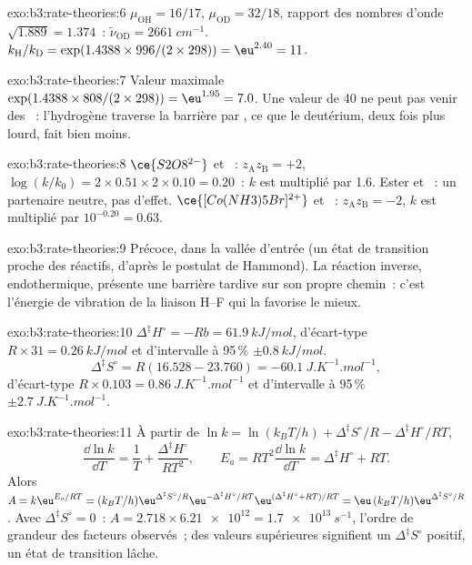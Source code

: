 \begin{solution}{exo:b3:rate-theories:6}
$\mu_{\mathrm{OH}} = 16/17$, $\mu_{\mathrm{OD}} = 32/18$, rapport des nombres d'onde $\sqrt{1.889} = 1.374$~:
$\tilde\nu_{\mathrm{OD}} = \qty{2661}{cm^{-1}}$. $k_{\mathrm H}/k_{\mathrm D} = \exp(1.4388 \times 996/(2 \times 298)) = \eu^{2.40} = 11$.
\end{solution}

\begin{solution}{exo:b3:rate-theories:7}
Valeur maximale $\exp(1.4388 \times 808/(2 \times 298)) = \eu^{1.95} = 7.0$.
Une valeur de 40 ne peut pas venir des ~:
l'hydrogène traverse la barrière par , ce que le deutérium,
deux fois plus lourd, fait bien moins.
\end{solution}

\begin{solution}{exo:b3:rate-theories:8}
$\ce{S2O8^{2-}}$ et ~: $z_{\mathrm A}z_{\mathrm B} = +2$, $\log(k/k_0) = 2 \times 0.51 \times 2 \times 0.10 = 0.20$~: $k$
est multiplié par 1.6. Ester et ~: un partenaire neutre, pas
d'effet.
$\ce{[Co(NH3)5Br]^{2+}}$ et ~: $z_{\mathrm A}z_{\mathrm B} = -2$,
$k$ est multiplié par $10^{-0.20} = 0.63$.
\end{solution}

\begin{solution}{exo:b3:rate-theories:9}
Précoce, dans la vallée d'entrée (un état de transition proche des
réactifs, d'après le postulat de Hammond). La réaction inverse,
endothermique, présente une barrière tardive sur son propre chemin~:
c'est l'énergie de vibration de la liaison H--F qui la favorise le
mieux.
\end{solution}

\begin{solution}{exo:b3:rate-theories:10}
$\Delta^{\ddagger}H^\circ = -Rb = \qty{61.9}{kJ/mol}$, d'écart-type $R \times 31 = \qty{0.26}{kJ/mol}$ et
d'intervalle à 95\,\% $\pm\qty{0.8}{kJ/mol}$.
\[
  \Delta^{\ddagger}S^\circ = R(16.528 - 23.760) = \qty{-60.1}{J.K^{-1}.mol^{-1}},
\]
d'écart-type $R \times 0.103 = \qty{0.86}{J.K^{-1}.mol^{-1}}$ et d'intervalle à 95\,\% $\pm\qty{2.7}{J.K^{-1}.mol^{-1}}$.
\end{solution}

\begin{solution}{exo:b3:rate-theories:11}
À partir de $\ln k = \ln(k_BT/h) + \Delta^{\ddagger}S^\circ/R - \Delta^{\ddagger}H^\circ/RT$,
\[
  \frac{\dd\ln k}{\dd T} = \frac1T + \frac{\Delta^{\ddagger}H^\circ}{RT^2}, \qquad
  E_a = RT^2\frac{\dd\ln k}{\dd T} = \Delta^{\ddagger}H^\circ + RT .
\] Alors $A = k\eu^{E_a/RT} = (k_BT/h)\eu^{\Delta^{\ddagger}S^\circ/R}\eu^{-\Delta^{\ddagger}H^\circ/RT}\eu^{(\Delta^{\ddagger}H^\circ + RT)/RT} =
\eu\,(k_BT/h)\eu^{\Delta^{\ddagger}S^\circ/R}$. Avec $\Delta^{\ddagger}S^\circ = 0$~: $A = 2.718 \times \num{6.21e12} = \qty{1.7e13}{s^{-1}}$,
l'ordre de grandeur des facteurs observés~; des valeurs supérieures
signifient un $\Delta^{\ddagger}S^\circ$ positif, un état de transition
lâche.
\end{solution}

